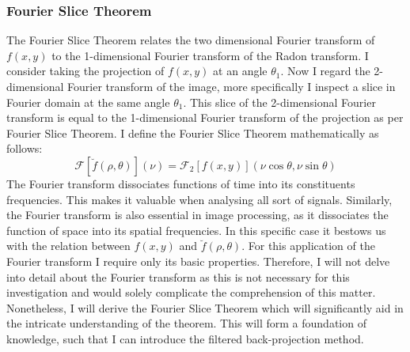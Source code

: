 \documentclass[12pt]{article}
\begin{document}
\subsubsection{Fourier Slice Theorem}
The Fourier Slice Theorem relates the two dimensional Fourier transform of $f(x,y)$ to the 1-dimensional Fourier transform of the Radon transform. I consider taking the projection of $f(x,y)$ at an angle $\theta_1$. Now I regard the 2-dimensional Fourier transform of the image, more specifically I inspect a slice in Fourier domain at the same angle $\theta_1$. This slice of the 2-dimensional Fourier transform is equal to the 1-dimensional Fourier transform of the projection as per Fourier Slice Theorem. I define the Fourier Slice Theorem mathematically as follows:
\begin{equation}\label{eq.14}
	\mathcal{F}[\breve{f}(\rho, \theta)](\nu) = \mathcal{F}_2[f(x,y)](\nu\cos{\theta}, \nu\sin{\theta})
\end{equation}
 The Fourier transform dissociates functions of time into its constituents frequencies. This makes it valuable when analysing all sort of signals. Similarly, the Fourier transform is also essential in image processing, as it dissociates the function of space into its spatial frequencies. In this specific case it bestows us with the relation between $f(x,y)$ and $\breve{f}(\rho, \theta)$. For this application of the Fourier transform I require only its basic properties. Therefore, I will not delve into detail about the Fourier transform as this is not necessary for this investigation and would solely complicate the comprehension of this matter. Nonetheless, I will derive the Fourier Slice Theorem which will significantly aid in the intricate understanding of the theorem. This will form a foundation of knowledge, such that I can introduce the filtered back-projection method.
 
\end{document}
